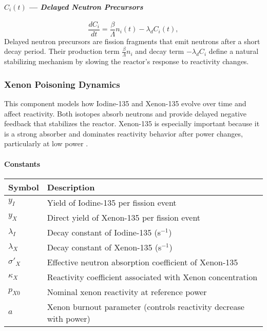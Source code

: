 \documentclass[11pt]{article}
\begin{document}
\paragraph{\textbf{$C_i(t)$ --- \textit{Delayed Neutron Precursors}}}
\begin{equation}
\frac{d C_i}{d t} =
\frac{\beta}{\Lambda} n_i(t)
- \lambda_d C_i(t),
\label{eq:precursor_concentration}
\end{equation}
Delayed neutron precursors are fission fragments that emit neutrons after a short decay period. Their production term $\frac{\beta}{\Lambda} n_i$ and decay term $-\lambda_d C_i$ define a natural stabilizing mechanism by slowing the reactor’s response to reactivity changes.

\subsubsection{Xenon Poisoning Dynamics}
This component models how Iodine-135 and Xenon-135 evolve over time and affect reactivity. Both isotopes absorb neutrons and provide delayed negative feedback that stabilizes the reactor. Xenon-135 is especially important because it is a strong absorber and dominates reactivity behavior after power changes, particularly at low power \cite{Duderstadt1976,Lewis2008,NP_Xenon}.

\paragraph{\textbf{Constants}}
\begin{center}
\begin{tabular}{@{}ll@{}}
\toprule
\textbf{Symbol} & \textbf{Description} \\ 
\midrule
$y_I$ & Yield of Iodine-135 per fission event \\
$y_X$ & Direct yield of Xenon-135 per fission event \\
$\lambda_I$ & Decay constant of Iodine-135 (s$^{-1}$) \\
$\lambda_X$ & Decay constant of Xenon-135 (s$^{-1}$) \\
$\sigma'_X$ & Effective neutron absorption coefficient of Xenon-135 \\
$\kappa_X$ & Reactivity coefficient associated with Xenon concentration \\
$p_{X0}$ & Nominal xenon reactivity at reference power \\
$a$ & Xenon burnout parameter (controls reactivity decrease with power) \\
\bottomrule
\end{tabular}
\end{center}
\end{document}
